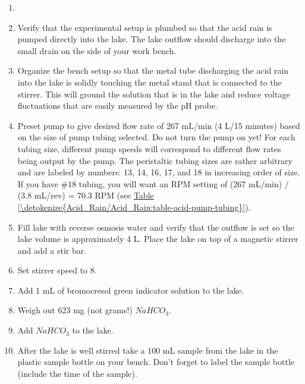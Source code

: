 \documentclass[letterpaper,10pt,english]{sphinxmanual}
\begin{document}
\begin{enumerate}
\item {} 
{\hyperref[\detokenize{ProCoDA/ProCoDA:heading-procoda-ph-measurement}]{}}

\item {} 
Verify that the experimental setup is plumbed so that the acid rain is pumped directly into the lake.  The lake outflow should discharge into the small drain on the side of your work bench.

\item {} 
Organize the bench setup so that the metal tube discharging the acid rain into the lake is solidly touching the metal stand that is connected to the stirrer. This will ground the solution that is in the lake and reduce voltage fluctuations that are easily measured by the pH probe.

\item {} 
Preset pump to give desired flow rate of 267 mL/min (4 L/15 minutes) based on the size of pump tubing selected. Do not turn the pump on yet! For each tubing size, different pump speeds will correspond to different flow rates being output by the pump. The peristaltic tubing sizes are rather arbitrary and are labeled by numbers: 13, 14, 16, 17, and 18 in increasing order of size. If you have \#18 tubing, you will want an RPM setting of (267 mL/min) / (3.8 mL/rev) = 70.3 RPM (see \hyperref[\detokenize{Acid_Rain/Acid_Rain:table-acid-pump-tubing}]{Table \ref{\detokenize{Acid_Rain/Acid_Rain:table-acid-pump-tubing}}}).

\item {} 
Fill lake with reverse osmosis water and verify that the outflow is set so the lake volume is approximately 4 L.  Place the lake on top of a magnetic stirrer and add a stir bar.

\item {} 
Set stirrer speed to 8.

\item {} 
Add 1 mL of bromocresol green indicator solution to the lake.

\item {} 
Weigh out 623 mg (not grams!) \(NaHCO_3\).

\item {} 
Add \(NaHCO_3\) to the lake.

\item {} 
After the lake is well stirred take a 100 mL sample from the lake in the plastic sample bottle on your bench.  Don’t forget to label the sample bottle (include the time of the sample).


\end{enumerate}
\end{document}

